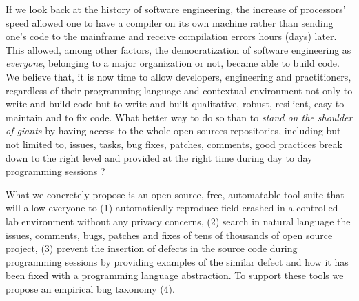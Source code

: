 If we look back at the history of software engineering, the increase of processors' speed allowed one to have a compiler on its own machine rather than sending one's code to the mainframe and receive compilation errors hours (days) later. This allowed, among other factors, the democratization of software engineering as {\it everyone}, belonging to a major organization or not, became able to build code. We believe that, it is now time to allow developers, engineering and practitioners, regardless of their programming language and contextual environment not only to write and build code but to write and built qualitative, robust, resilient, easy to maintain and to fix code. What better way to do so than to {\it stand on the shoulder of giants} by having access to the whole open sources repositories, including but not limited to, issues, tasks, bug fixes, patches, comments, good practices break down to the right level and provided at the right time during day to day programming sessions ?

What we concretely propose is an open-source, free, automatable tool suite that will allow everyone to (1) automatically reproduce field crashed in a controlled lab environment without any privacy concerns, (2) search in natural language the issues, comments, bugs, patches and fixes of tens of thousands of open source project, (3) prevent the insertion of defects in the source code during programming sessions by providing examples of the similar defect and how it has been fixed with a programming language abstraction. To support these tools we propose an empirical bug taxonomy (4).


